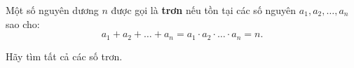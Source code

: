 \ifshowproblem
\begin{problem}\label{example:GER-2015-MO-P2}
    Một số nguyên dương \( n \) được gọi là \textbf{trơn} nếu tồn tại các số nguyên \( a_1, a_2, \dots, a_n \) sao cho:
    \[
        a_1 + a_2 + \dots + a_n = a_1 \cdot a_2 \cdot \dots \cdot a_n = n.
    \]
    
    Hãy tìm tất cả các số trơn.
\end{problem}
\fi

\footnotemark
{}
\fi